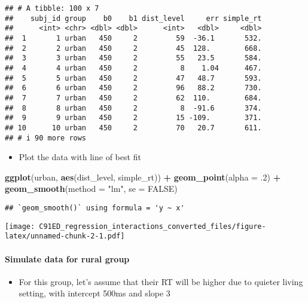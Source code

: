 \documentclass[
]{article}
\newenvironment{Shaded}{\begin{snugshade}}{\end{snugshade}}
\newcommand{\AttributeTok}[1]{\textcolor[rgb]{0.13,0.29,0.53}{#1}}
\newcommand{\ConstantTok}[1]{\textcolor[rgb]{0.56,0.35,0.01}{#1}}
\newcommand{\DecValTok}[1]{\textcolor[rgb]{0.00,0.00,0.81}{#1}}
\newcommand{\FunctionTok}[1]{\textcolor[rgb]{0.13,0.29,0.53}{\textbf{#1}}}
\newcommand{\NormalTok}[1]{#1}
\newcommand{\SpecialCharTok}[1]{\textcolor[rgb]{0.81,0.36,0.00}{\textbf{#1}}}
\newcommand{\StringTok}[1]{\textcolor[rgb]{0.31,0.60,0.02}{#1}}
\providecommand{\tightlist}{%
  \setlength{\itemsep}{0pt}\setlength{\parskip}{0pt}}
\begin{document}
\begin{verbatim}
## # A tibble: 100 x 7
##    subj_id group    b0    b1 dist_level     err simple_rt
##      <int> <chr> <dbl> <dbl>      <int>   <dbl>     <dbl>
##  1       1 urban   450     2         59  -36.1       532.
##  2       2 urban   450     2         45  128.        668.
##  3       3 urban   450     2         55   23.5       584.
##  4       4 urban   450     2          8    1.04      467.
##  5       5 urban   450     2         47   48.7       593.
##  6       6 urban   450     2         96   88.2       730.
##  7       7 urban   450     2         62  110.        684.
##  8       8 urban   450     2          8  -91.6       374.
##  9       9 urban   450     2         15 -109.        371.
## 10      10 urban   450     2         70   20.7       611.
## # i 90 more rows
\end{verbatim}

\begin{itemize}
\tightlist
\item
  Plot the data with line of best fit
\end{itemize}

\begin{Shaded}
\begin{Highlighting}[]
\FunctionTok{ggplot}\NormalTok{(urban, }\FunctionTok{aes}\NormalTok{(dist\_level, simple\_rt)) }\SpecialCharTok{+} 
  \FunctionTok{geom\_point}\NormalTok{(}\AttributeTok{alpha =}\NormalTok{ .}\DecValTok{2}\NormalTok{) }\SpecialCharTok{+}
  \FunctionTok{geom\_smooth}\NormalTok{(}\AttributeTok{method =} \StringTok{"lm"}\NormalTok{, }\AttributeTok{se =} \ConstantTok{FALSE}\NormalTok{)}
\end{Highlighting}
\end{Shaded}

\begin{verbatim}
## `geom_smooth()` using formula = 'y ~ x'
\end{verbatim}

\texttt{[image: C91ED\_regression\_interactions\_converted\_files/figure-latex/unnamed-chunk-2-1.pdf]}

\hypertarget{simulate-data-for-rural-group}{%
\paragraph{Simulate data for rural
group}\label{simulate-data-for-rural-group}}

\begin{itemize}
\tightlist
\item
  For this group, let's assume that their RT will be higher due to
  quieter living setting, with intercept 500ms and slope 3
\end{itemize}
\end{document}
